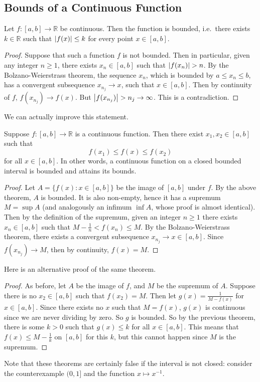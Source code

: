 \subsection{Bounds of a Continuous Function}
\begin{theorem}
	Let \(f \colon [a, b] \to \mathbb R\) be continuous.
	Then the function is bounded, i.e.\ there exists \(k \in \mathbb R\) such that \(\abs{f(x)} \leq k\) for every point \(x \in [a, b]\).
\end{theorem}
\begin{proof}
	Suppose that such a function \(f\) is not bounded.
	Then in particular, given any integer \(n \geq 1\), there exists \(x_n \in [a, b]\) such that \(\abs{f(x_n)} > n\).
	By the Bolzano-Weierstrass theorem, the sequence \(x_n\), which is bounded by \(a \leq x_n \leq b\), has a convergent subsequence \(x_{n_j} \to x\), such that \(x \in [a, b]\).
	Then by continuity of \(f\), \(f(x_{n_j}) \to f(x)\).
	But \(\abs{f(x_{n_j})} > n_j \to \infty\).
	This is a contradiction.
\end{proof}
\noindent We can actually improve this statement.
\begin{theorem}
	Suppose \(f \colon [a, b] \to \mathbb R\) is a continuous function.
	Then there exist \(x_1, x_2 \in [a, b]\) such that
	\[
		f(x_1) \leq f(x) \leq f(x_2)
	\]
	for all \(x \in [a, b]\).
	In other words, a continuous function on a closed bounded interval is bounded and attains its bounds.
\end{theorem}
\begin{proof}
	Let \(A = \{ f(x) \colon x \in [a, b] \}\) be the image of \([a, b]\) under \(f\).
	By the above theorem, \(A\) is bounded.
	It is also non-empty, hence it has a supremum \(M = \sup A\) (and analogously an infimum \(\inf A\), whose proof is almost identical).
	Then by the definition of the supremum, given an integer \(n \geq 1\) there exists \(x_n \in [a, b]\) such that \(M - \frac{1}{n} < f(x_n) \leq M\).
	By the Bolzano-Weierstrass theorem, there exists a convergent subsequence \(x_{n_j} \to x \in [a, b]\).
	Since \(f(x_{n_j}) \to M\), then by continuity, \(f(x) = M\).
\end{proof}
\noindent Here is an alternative proof of the same theorem.
\begin{proof}
	As before, let \(A\) be the image of \(f\), and \(M\) be the supremum of \(A\).
	Suppose there is no \(x_2 \in [a, b]\) such that \(f(x_2) = M\).
	Then let \(g(x) = \frac{1}{M - f(x)}\) for \(x \in [a, b]\).
	Since there exists no \(x\) such that \(M = f(x)\), \(g(x)\) is continuous since we are never dividing by zero.
	So \(g\) is bounded.
	So by the previous theorem, there is some \(k > 0\) such that \(g(x) \leq k\) for all \(x \in [a, b]\).
	This means that \(f(x) \leq M - \frac{1}{k}\) on \([a, b]\) for this \(k\), but this cannot happen since \(M\) is the supremum.
\end{proof}
\noindent Note that these theorems are certainly false if the interval is not closed: consider the counterexample \((0, 1]\) and the function \(x \mapsto x^{-1}\).

